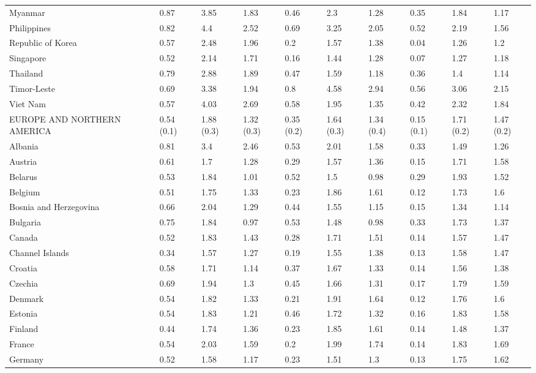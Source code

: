 \begin{longtable}[t]{llllllllll}
Myanmar & 0.87 & 3.85 & 1.83 & 0.46 & 2.3 & 1.28 & 0.35 & 1.84 & 1.17\\
Philippines & 0.82 & 4.4 & 2.52 & 0.69 & 3.25 & 2.05 & 0.52 & 2.19 & 1.56\\
Republic of Korea & 0.57 & 2.48 & 1.96 & 0.2 & 1.57 & 1.38 & 0.04 & 1.26 & 1.2\\
Singapore & 0.52 & 2.14 & 1.71 & 0.16 & 1.44 & 1.28 & 0.07 & 1.27 & 1.18\\
Thailand & 0.79 & 2.88 & 1.89 & 0.47 & 1.59 & 1.18 & 0.36 & 1.4 & 1.14\\
Timor-Leste & 0.69 & 3.38 & 1.94 & 0.8 & 4.58 & 2.94 & 0.56 & 3.06 & 2.15\\
Viet Nam & 0.57 & 4.03 & 2.69 & 0.58 & 1.95 & 1.35 & 0.42 & 2.32 & 1.84\\
EUROPE AND NORTHERN AMERICA & 0.54 (0.1) & 1.88 (0.3) & 1.32 (0.3) & 0.35 (0.2) & 1.64 (0.3) & 1.34 (0.4) & 0.15 (0.1) & 1.71 (0.2) & 1.47 (0.2)\\
Albania & 0.81 & 3.4 & 2.46 & 0.53 & 2.01 & 1.58 & 0.33 & 1.49 & 1.26\\
Austria & 0.61 & 1.7 & 1.28 & 0.29 & 1.57 & 1.36 & 0.15 & 1.71 & 1.58\\
Belarus & 0.53 & 1.84 & 1.01 & 0.52 & 1.5 & 0.98 & 0.29 & 1.93 & 1.52\\
Belgium & 0.51 & 1.75 & 1.33 & 0.23 & 1.86 & 1.61 & 0.12 & 1.73 & 1.6\\
Bosnia and Herzegovina & 0.66 & 2.04 & 1.29 & 0.44 & 1.55 & 1.15 & 0.15 & 1.34 & 1.14\\
Bulgaria & 0.75 & 1.84 & 0.97 & 0.53 & 1.48 & 0.98 & 0.33 & 1.73 & 1.37\\
Canada & 0.52 & 1.83 & 1.43 & 0.28 & 1.71 & 1.51 & 0.14 & 1.57 & 1.47\\
Channel Islands & 0.34 & 1.57 & 1.27 & 0.19 & 1.55 & 1.38 & 0.13 & 1.58 & 1.47\\
Croatia & 0.58 & 1.71 & 1.14 & 0.37 & 1.67 & 1.33 & 0.14 & 1.56 & 1.38\\
Czechia & 0.69 & 1.94 & 1.3 & 0.45 & 1.66 & 1.31 & 0.17 & 1.79 & 1.59\\
Denmark & 0.54 & 1.82 & 1.33 & 0.21 & 1.91 & 1.64 & 0.12 & 1.76 & 1.6\\
Estonia & 0.54 & 1.83 & 1.21 & 0.46 & 1.72 & 1.32 & 0.16 & 1.83 & 1.58\\
Finland & 0.44 & 1.74 & 1.36 & 0.23 & 1.85 & 1.61 & 0.14 & 1.48 & 1.37\\
France & 0.54 & 2.03 & 1.59 & 0.2 & 1.99 & 1.74 & 0.14 & 1.83 & 1.69\\
Germany & 0.52 & 1.58 & 1.17 & 0.23 & 1.51 & 1.3 & 0.13 & 1.75 & 1.62\\

\end{longtable}
